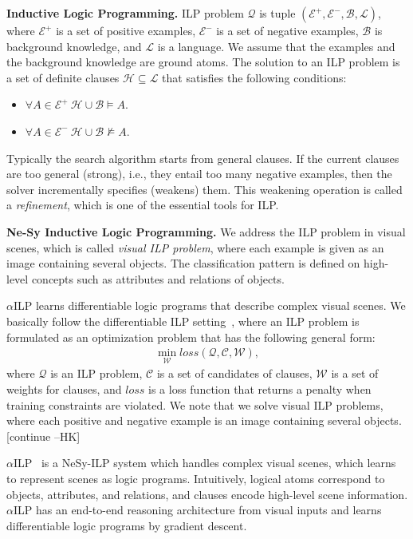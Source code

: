\documentclass[
]{ceurart}
\newcommand{\hk}[1]{\textcolor{Apricot}{[#1 \textsc{--HK}]}}
\begin{document}
	
	\textbf{Inductive Logic Programming.}
	ILP problem $\mathcal{Q}$ is tuple $(\mathcal{E}^+, \mathcal{E}^-, \mathcal{B}, \mathcal{L})$, where
	$\mathcal{E}^+$ is a set of positive examples, $\mathcal{E}^-$ is a set of negative examples, $\mathcal{B}$ is background knowledge, 
	and $\mathcal{L}$ is a language. We assume that the examples and the background knowledge are ground atoms.
	The solution to an ILP problem is a set of definite clauses $\mathcal{H} \subseteq \mathcal{L}$
	that satisfies the following conditions:
	\begin{itemize}
		\item $\forall A \in \mathcal{E}^+ ~ \mathcal{H} \cup \mathcal{B}  \models A$.
		\item $\forall A \in \mathcal{E}^-  ~\mathcal{H} \cup \mathcal{B} \not \models A.$
	\end{itemize}
	Typically the search algorithm starts from general clauses. If the current clauses are too general (strong), i.e., they entail too many negative examples, then the solver incrementally specifies (weakens) them.
	This weakening operation is called a {\it refinement}, which is one of the essential tools for ILP.
	
	
	\textbf{Ne-Sy Inductive Logic Programming.} We address the ILP problem in visual scenes, which is called \emph{visual ILP problem}, where each example is given as an image containing several objects.
	The classification pattern is defined on high-level concepts such as attributes and relations of objects.
	
	$\alpha$ILP learns differentiable logic programs that describe complex visual scenes.
	We basically follow the differentiable ILP setting~\cite{Evans2018,Shindo21}, where an ILP problem is formulated as an optimization problem that has the following general form:
	\begin{align}
		\min_\mathcal{W} \mathit{loss}(\mathcal{Q}, \mathcal{C}, \mathcal{W}),
	\end{align}
	where $\mathcal{Q}$ is an ILP problem, $\mathcal{C}$ is a set of candidates of clauses, $\mathcal{W}$ is a set of weights for clauses, and $\mathit{loss}$ is a loss function that returns a penalty when training constraints are violated.
	We note that we solve visual ILP problems, where each positive and negative example is an image containing several objects.\hk{continue}
	
	
	$\alpha$ILP~\cite{Shindo2023alphailp} is a NeSy-ILP system which handles complex visual scenes, which learns to represent scenes as logic programs. Intuitively, logical atoms correspond to objects, attributes, and relations, and clauses encode high-level scene information. $\alpha$ILP has an end-to-end reasoning architecture from visual inputs and learns differentiable logic programs by gradient descent.
	
\end{document}
